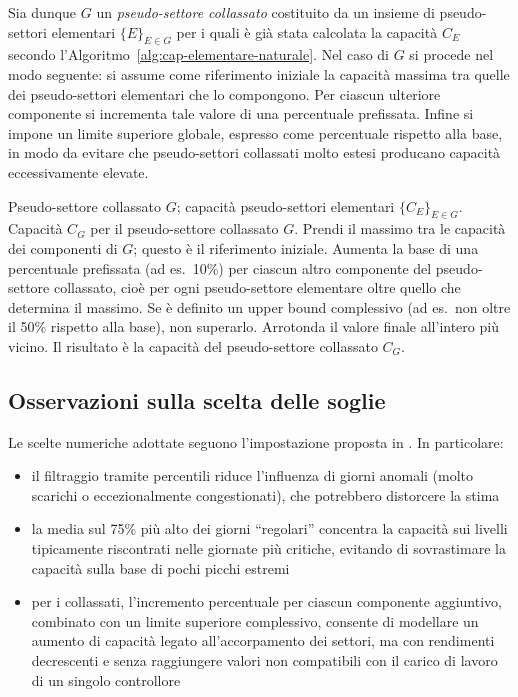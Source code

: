 Sia dunque \(G\) un \emph{pseudo-settore collassato} costituito da un insieme di pseudo-settori elementari \(\{E\}_{E \in G}\) per i quali è già stata calcolata la capacità \(C_E\) secondo l’Algoritmo~\ref{alg:cap-elementare-naturale}. Nel caso di \(G\) si procede nel modo seguente: si assume come riferimento iniziale la capacità massima tra quelle dei pseudo-settori elementari che lo compongono. Per ciascun ulteriore componente si incrementa tale valore di una percentuale prefissata. Infine si impone un limite superiore globale, espresso come percentuale rispetto alla base, in modo da evitare che pseudo-settori collassati molto estesi producano capacità eccessivamente elevate.
    
    \begin{algorithm}[H]
      \caption{Capacità di un pseudo-settore collassato.}
      \label{alg:cap-collassato-naturale}
      \begin{algorithmic}[1]
      
        \Require Pseudo-settore collassato $G$; capacità pseudo-settori elementari $\{C_E\}_{E \in G}$.
        \Ensure Capacità $C_G$ per il pseudo-settore collassato $G$.
        \State Prendi il massimo tra le capacità dei componenti di $G$; questo è il riferimento iniziale.
        \State Aumenta la base di una percentuale prefissata (ad es.\ 10\%) per ciascun altro componente del pseudo-settore collassato, cioè per ogni pseudo-settore elementare oltre quello che determina il massimo.
        \State Se è definito un upper bound complessivo (ad es.\ non oltre il 50\% rispetto alla base), non superarlo.
        \State Arrotonda il valore finale all’intero più vicino. Il risultato è la capacità del pseudo-settore collassato $C_G$.
      \end{algorithmic}
    \end{algorithm}
\subsection{Osservazioni sulla scelta delle soglie}
\label{subsec:cap-discussione}

Le scelte numeriche adottate seguono l’impostazione proposta in \cite{galeazzo2024integer}. In particolare:
\begin{itemize}
  \item il filtraggio tramite percentili riduce l’influenza di giorni anomali (molto scarichi o eccezionalmente congestionati), che potrebbero distorcere la stima
  \item la media sul 75\% più alto dei giorni ``regolari'' concentra la capacità sui livelli tipicamente riscontrati nelle giornate più critiche, evitando di sovrastimare la capacità sulla base di pochi picchi estremi
  \item per i collassati, l’incremento percentuale per ciascun componente aggiuntivo, combinato con un limite superiore complessivo, consente di modellare un aumento di capacità legato all’accorpamento dei settori, ma con rendimenti decrescenti e senza raggiungere valori non compatibili con il carico di lavoro di un singolo controllore
\end{itemize}
\clearpage
